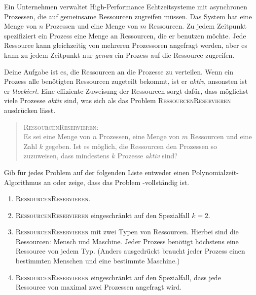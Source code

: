 \documentclass{uebung_cs}
\begin{document}
\begin{exercise}[Ressourcenmanagement]
	Ein Unternehmen verwaltet High-Performance Echtzeitsysteme mit asynchronen Prozessen, die auf gemeinsame Ressourcen zugreifen müssen. Das System hat eine Menge von $n$ Prozessen und eine Menge von $m$ Ressourcen. 
	Zu jedem Zeitpunkt spezifiziert ein Prozess eine Menge an Ressourcen, die er benutzen möchte. Jede Ressource kann gleichzeitig von mehreren Prozessoren angefragt werden, aber es kann zu jedem Zeitpunkt nur \emph{genau} ein Prozess auf die Ressource zugreifen. 
	
	Deine Aufgabe ist es, die Ressourcen an die Prozesse zu verteilen. Wenn ein Prozess alle benötigten Ressourcen zugeteilt bekommt, ist er \textit{aktiv}, ansonsten ist er \textit{blockiert}. Eine effiziente Zuweisung der Ressourcen sorgt dafür, dass möglichst viele Prozesse \textit{aktiv} sind, was sich als das Problem \textsc{RessourcenReservieren} ausdrücken lässt.
	 \begin{quote}
	 \textsc{RessourcenReservieren}:\\
	 Es sei eine Menge von $n$ Prozessen, eine Menge von $m$ Ressourcen und eine Zahl $k$ gegeben. Ist es möglich, die Ressourcen den Prozessen so zuzuweisen, dass mindestens $k$ Prozesse \textit{aktiv} sind?
	 \end{quote}
	 
	Gib für jedes Problem auf der folgenden Liste entweder einen Polynomialzeit-Algorithmus an oder zeige, dass das Problem \NP-vollständig ist.
	 \begin{enumerate}
	 	\item \textsc{RessourcenReservieren}.
	 	\item \textsc{RessourcenReservieren} eingeschränkt auf den Spezialfall $k=2$.
	 	\item \textsc{RessourcenReservieren} mit zwei Typen von Ressourcen. Hierbei sind die Ressourcen: Mensch und Maschine. Jeder Prozess benötigt höchstens eine Ressource von jedem Typ. (Anders ausgedrückt braucht jeder Prozess einen bestimmten Menschen und eine bestimmte Maschine.)
	 	\item \textsc{RessourcenReservieren} eingeschränkt auf den Spezialfall, dass jede Ressource von maximal zwei Prozessen angefragt wird.	 	
	 \end{enumerate}
\end{exercise}
\end{document}
